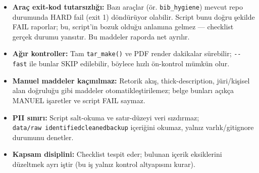 \documentclass[
  turkish,
  12pt,
  a4paper,
]{report}
\providecommand{\tightlist}{%
  \setlength{\itemsep}{0pt}\setlength{\parskip}{0pt}}
\begin{document}
\begin{itemize}
\tightlist
\item
  \textbf{Araç exit-kod tutarsızlığı:} Bazı araçlar (ör.
  \texttt{bib\_hygiene}) mevcut repo durumunda HARD fail (exit 1)
  döndürüyor olabilir. Script bunu doğru şekilde FAIL raporlar; bu,
  script'in bozuk olduğu anlamına gelmez --- checklist gerçek durumu
  yansıtır. Bu maddeler raporda net ayrılır.
\item
  \textbf{Ağır kontroller:} Tam \texttt{tar\_make()} ve PDF render
  dakikalar sürebilir; \texttt{-\/-fast} ile bunlar SKIP edilebilir,
  böylece hızlı ön-kontrol mümkün olur.
\item
  \textbf{Manuel maddeler kaçınılmaz:} Retorik akış, thick-description,
  jüri/kişisel alan doğruluğu gibi maddeler otomatikleştirilemez; belge
  bunları açıkça MANUEL işaretler ve script FAIL saymaz.
\item
  \textbf{PII sınırı:} Script salt-okuma ve satır-düzeyi veri sızdırmaz;
  \texttt{data/raw\textbar{}\ identified\textbar{}cleaned\textbar{}backup}
  içeriğini okumaz, yalnız varlık/gitignore durumunu denetler.
\item
  \textbf{Kapsam disiplini:} Checklist tespit eder; bulunan içerik
  eksiklerini düzeltmek ayrı iştir (bu iş yalnız kontrol altyapısını
  kurar).
\end{itemize}
\end{document}
